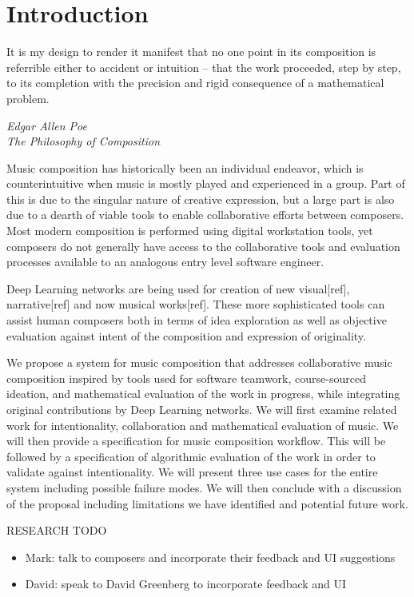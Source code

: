 \documentclass[final,authoryear,11pt,times]{elsarticle}
\begin{document}
\section{Introduction}
\label{sec:introduction}

\epigraph{It is my design to render it manifest that no one point in its composition is referrible either to accident or intuition -- that the work proceeded, step by step, to its completion with the precision and rigid consequence of a mathematical problem.}{\textit{Edgar Allen Poe \\ The Philosophy of Composition}}

Music composition has historically been an individual endeavor, which is counterintuitive when music is
mostly played and experienced in a group. Part of this is due to the singular nature of creative 
expression, but a large part is also due to a dearth of viable tools to enable collaborative efforts
between composers. Most modern composition is performed using digital workstation tools, yet composers do not generally
have access to the collaborative tools and evaluation processes available to an analogous entry level software engineer.

Deep Learning networks are being used for creation of new visual[ref], narrative[ref] and now musical works[ref].
These more sophisticated tools can assist human composers both in terms of idea exploration as well as 
objective evaluation against intent of the composition and expression of originality.

We propose a system for music composition that addresses collaborative music composition inspired by
tools used for software teamwork, course-sourced ideation, and mathematical evaluation of the work in progress,
while integrating original contributions by Deep Learning networks.
We will first examine related work for intentionality, collaboration and mathematical evaluation of music.  We will
then provide a specification for music composition workflow. This will be
followed by a specification of algorithmic evaluation of the work in order to validate against intentionality.
We will present three use cases for the entire system including possible failure modes. We will then 
conclude with a discussion of the proposal including limitations we have identified and potential future work.


RESEARCH TODO
\begin{itemize}
\item Mark: talk to composers and incorporate their feedback and UI suggestions
\item David: speak to David Greenberg to incorporate feedback and UI
\end{itemize}
\end{document}
